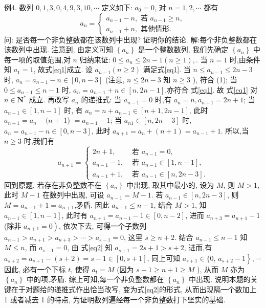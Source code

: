 例4. 数列 $0,1,3,0,4,9,3,10, \cdots$ 定义如下:
$a_0=0$, 对 $n=1,2, \cdots$ 都有
$$
a_n=\left\{\begin{array}{l}
a_{n-1}-n, \text { 若 } a_{n-1} \geqslant n, \\
a_{n-1}+n, \text { 其他情形.
}
\end{array}\right.
$$
问: 是否每一个非负整数都在该数列中出现? 证明你的结论.
解:每个非负整数都在该数列中出现.
注意到, 由定义可知 $\left\{a_n\right\}$ 是一个整数数列, 我们先确定 $\left\{a_n\right\}$ 中每一项的取值范围,对 $n$ 归纳来证: $0 \leqslant a_n \leqslant 2 n-1(n \geqslant 1), \label{eq1}$.
当 $n=1$ 时,由条件知 $a_1=1$, 故式\ref{eq1}成立.
设 $a_{n-1}(n \geqslant 2)$ 满足式\ref{eq1}. 当 $n \leqslant a_{n-1} \leqslant 2 n-3$ 时, $a_n=a_{n-1}-n \in[0, n-3]$ (注意, $n \leqslant 2 n-3$ 知 $n \geqslant 3$ ), 符合 (1); 当 $0 \leqslant a_{n-1} \leqslant n-1$ 时, $a_n=a_{n-1}+n \in[n, 2 n-1]$,亦符合 式\ref{eq1}. 故 式\ref{eq1} 对 $n \in \mathbf{N}^*$ 成立.
再改写 $a_n$ 的递推式: 当 $a_{n-1}=0$ 时,有 $a_n=n, a_{n+1}=2 n+1$; 当 $a_{n-1} \in [1, n-1]$ 时, 有 $a_n=n+a_{n-1} \in[n+1,2 n-1]$, 此时 $a_{n+1}=a_n-(n+$ 1) $=a_{n-1}-1$; 当 $a_{n 1} \in[n, 2 n-3]$ 时, $a_n=a_{n-1}-n \in[0, n-3]$, 此时 $a_{n+1}= a_n+(n+1)=a_{n-1}+1$. 所以,当 $n \geqslant 3$ 时,我们有
$$
a_{n+1}= \begin{cases}2 n+1, & \text { 若 } a_{n-1}=0, \\ a_{n-1}-1, & \text { 若 } a_{n-1} \in[1, n-1], \\ a_{n-1}+1, & \text { 若 } a_{n-1} \in[n, 2 n-3] .\end{cases} \label{eq2}
$$
回到原题, 若存在非负整数不在 $\left\{a_n\right\}$ 中出现, 取其中最小的, 设为 $M$, 则 $M>1$, 此时 $M-1$ 在数列中出现, 可设 $a_{n-1}=M-1$. 若 $a_{n-1} \in[n, 2 n-3]$, 则 $M=a_{n-1}+1=a_{n+1}$,矛盾.
因此 $a_{n-1} \leqslant n-1$, 结合 $M>1$, 知 $a_{n-1} \in[1, n-1]$, 此时有 $a_{n+1}=a_{n-1}-1 \in[0, n-2]$, 进而 $a_{n+3}=a_{n+1}-1$ (除非 $\left.a_{n+1}=0\right)$, 依次下去, 可得一个子数列 $a_{n-1}>a_{n+1}>a_{n+3}>\cdots>a_{s-1}=0$, 这里 $s \geqslant n+2$.
结合 $a_{n-1} \leqslant n-1$ 知 $M \leqslant n$, 而 $a_{s-1}=0$, 由 式\ref{eq2} 知 $a_{s+1}=2 s+1>s+2$, 进而,有 $a_{s+2}=a_{s+1}-(s+2)=s-1 \in[0, s+1]$, 同上可知 $a_{s+1} \in\{0$, $\left.a_{s+2}-1\right\}, \cdots$ 因此, 必有一个下标 $t$, 使得 $a_t=M$ (因为 $s-1 \geqslant n+1 \geqslant M$ ), 从而 $M$ 亦为 $\left\{a_n\right\}$ 中的项,矛盾.
综上可知,每一个非负整数都在 $\left\{a_n\right\}$ 中出现.
说明本题的关键在于对题给的递推式作出恰当改写, 变为式\ref{eq2}的形式, 从而出现隔一个数加上 1 或者减去 1 的特点, 为证明数列遍经每一个非负整数打下坚实的基础.



